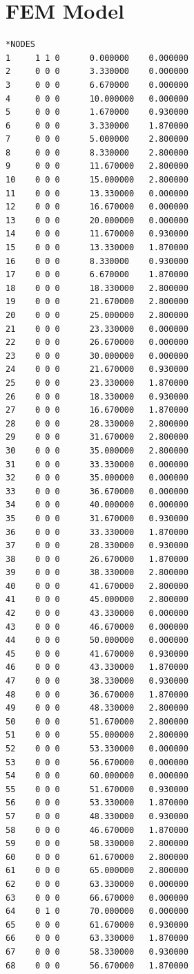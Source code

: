 \documentclass[10pt,a4paper,final]{report}
\begin{document}
\section{FEM Model}
\begin{lstlisting}
*NODES
1 	  1 1 0 	 0.000000 	 0.000000
2 	  0 0 0 	 3.330000 	 0.000000
3 	  0 0 0 	 6.670000 	 0.000000
4 	  0 0 0 	 10.000000 	 0.000000
5 	  0 0 0 	 1.670000 	 0.930000
6 	  0 0 0 	 3.330000 	 1.870000
7 	  0 0 0 	 5.000000 	 2.800000
8 	  0 0 0 	 8.330000 	 2.800000
9 	  0 0 0 	 11.670000 	 2.800000
10 	  0 0 0 	 15.000000 	 2.800000
11 	  0 0 0 	 13.330000 	 0.000000
12 	  0 0 0 	 16.670000 	 0.000000
13 	  0 0 0 	 20.000000 	 0.000000
14 	  0 0 0 	 11.670000 	 0.930000
15 	  0 0 0 	 13.330000 	 1.870000
16 	  0 0 0 	 8.330000 	 0.930000
17 	  0 0 0 	 6.670000 	 1.870000
18 	  0 0 0 	 18.330000 	 2.800000
19 	  0 0 0 	 21.670000 	 2.800000
20 	  0 0 0 	 25.000000 	 2.800000
21 	  0 0 0 	 23.330000 	 0.000000
22 	  0 0 0 	 26.670000 	 0.000000
23 	  0 0 0 	 30.000000 	 0.000000
24 	  0 0 0 	 21.670000 	 0.930000
25 	  0 0 0 	 23.330000 	 1.870000
26 	  0 0 0 	 18.330000 	 0.930000
27 	  0 0 0 	 16.670000 	 1.870000
28 	  0 0 0 	 28.330000 	 2.800000
29 	  0 0 0 	 31.670000 	 2.800000
30 	  0 0 0 	 35.000000 	 2.800000
31 	  0 0 0 	 33.330000 	 0.000000
32 	  0 0 0 	 35.000000 	 0.000000
33 	  0 0 0 	 36.670000 	 0.000000
34 	  0 0 0 	 40.000000 	 0.000000
35 	  0 0 0 	 31.670000 	 0.930000
36 	  0 0 0 	 33.330000 	 1.870000
37 	  0 0 0 	 28.330000 	 0.930000
38 	  0 0 0 	 26.670000 	 1.870000
39 	  0 0 0 	 38.330000 	 2.800000
40 	  0 0 0 	 41.670000 	 2.800000
41 	  0 0 0 	 45.000000 	 2.800000
42 	  0 0 0 	 43.330000 	 0.000000
43 	  0 0 0 	 46.670000 	 0.000000
44 	  0 0 0 	 50.000000 	 0.000000
45 	  0 0 0 	 41.670000 	 0.930000
46 	  0 0 0 	 43.330000 	 1.870000
47 	  0 0 0 	 38.330000 	 0.930000
48 	  0 0 0 	 36.670000 	 1.870000
49 	  0 0 0 	 48.330000 	 2.800000
50 	  0 0 0 	 51.670000 	 2.800000
51 	  0 0 0 	 55.000000 	 2.800000
52 	  0 0 0 	 53.330000 	 0.000000
53 	  0 0 0 	 56.670000 	 0.000000
54 	  0 0 0 	 60.000000 	 0.000000
55 	  0 0 0 	 51.670000 	 0.930000
56 	  0 0 0 	 53.330000 	 1.870000
57 	  0 0 0 	 48.330000 	 0.930000
58 	  0 0 0 	 46.670000 	 1.870000
59 	  0 0 0 	 58.330000 	 2.800000
60 	  0 0 0 	 61.670000 	 2.800000
61 	  0 0 0 	 65.000000 	 2.800000
62 	  0 0 0 	 63.330000 	 0.000000
63 	  0 0 0 	 66.670000 	 0.000000
64 	  0 1 0 	 70.000000 	 0.000000
65 	  0 0 0 	 61.670000 	 0.930000
66 	  0 0 0 	 63.330000 	 1.870000
67 	  0 0 0 	 58.330000 	 0.930000
68 	  0 0 0 	 56.670000 	 1.870000

\end{lstlisting}
\end{document}
